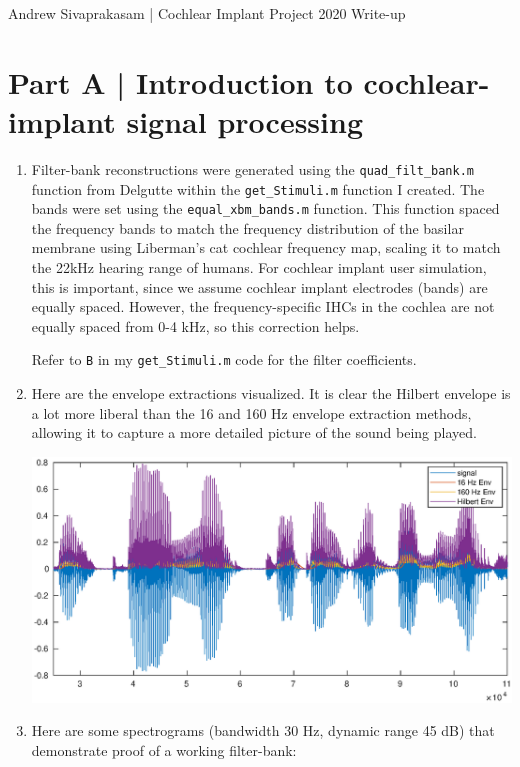 \documentclass[9pt]{extarticle}
\begin{document}
{\huge Andrew Sivaprakasam | Cochlear Implant Project 2020 Write-up}

\section{Part A | Introduction to cochlear-implant signal processing}

\begin{enumerate}[label = \alph*) ]
\item Filter-bank reconstructions were generated using the \verb|quad_filt_bank.m| function from Delgutte within the \verb|get_Stimuli.m| function I created. The bands were set using the \verb|equal_xbm_bands.m| function. This function spaced the frequency bands to match the frequency distribution of the basilar membrane using Liberman's cat cochlear frequency map, scaling it to match the 22kHz hearing range of humans. For cochlear implant user simulation, this is important, since we assume cochlear implant electrodes (bands) are equally spaced. However, the frequency-specific IHCs in the cochlea are not equally spaced from 0-4 kHz, so this correction helps.  

\vspace{.5em}

Refer to \verb|B| in my \verb|get_Stimuli.m| code for the filter coefficients. 

\item Here are the envelope extractions visualized. It is clear the Hilbert envelope is a lot more liberal than the 16 and 160 Hz envelope extraction methods, allowing it to capture a more detailed picture of the sound being played. 

\begin{center}
\includegraphics[width = .85\textwidth]{envelopes}
\end{center}

\item Here are some spectrograms (bandwidth 30 Hz, dynamic range 45 dB) that demonstrate proof of a working filter-bank: \\


\end{enumerate}
\end{document}
